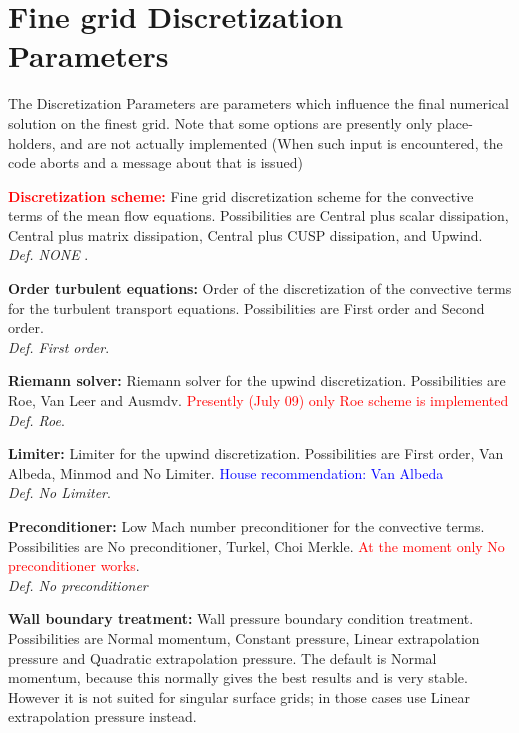 \documentclass[12pt,epsf,colordvi]{article}
\begin{document}
\section{Fine grid Discretization Parameters}
% 
The Discretization Parameters are parameters which influence the final numerical solution on the finest grid. Note that some options are presently only place-holders, and are not actually implemented (When such input is encountered, the code aborts and a message about that is issued) 
%
\begin{description}
	\item{\bf \textcolor{red}{Discretization scheme:}} Fine grid discretization scheme for the convective terms of the mean flow equations. Possibilities are Central plus scalar dissipation, Central plus matrix dissipation, Central plus CUSP dissipation, and Upwind. \\
{ \it Def.  NONE }.
%
    \item{\bf Order turbulent equations:} Order of the discretization of the convective terms for the turbulent transport equations. Possibilities are First order and Second order. \\
{\it Def.  First order}.
%
    \item{\bf Riemann solver:} Riemann solver for the upwind discretization. Possibilities are Roe, Van Leer and Ausmdv. \textcolor{red}{Presently  (July 09) only Roe scheme is implemented } \\
{\it Def.  Roe}.
%
     \item{\bf Limiter:}  Limiter for the upwind discretization. Possibilities are First order, Van Albeda, Minmod and No Limiter. \textcolor{blue}{House recommendation: Van Albeda }\\
{\it Def. No Limiter}.
%
    \item{\bf Preconditioner:} Low Mach number preconditioner for the convective terms. Possibilities are No preconditioner,  Turkel,  Choi Merkle.   \textcolor{red}{At the moment only No preconditioner works}. \\
{\it Def. No preconditioner }
%
     \item{\bf Wall boundary treatment: } Wall pressure boundary condition treatment. Possibilities are Normal momentum, Constant pressure, Linear extrapolation pressure and Quadratic extrapolation pressure. The default is Normal momentum, because this normally gives the best results and is very stable. However it is not suited for singular surface grids; in those cases use Linear extrapolation pressure instead.\\

\end{description}
\end{document}
